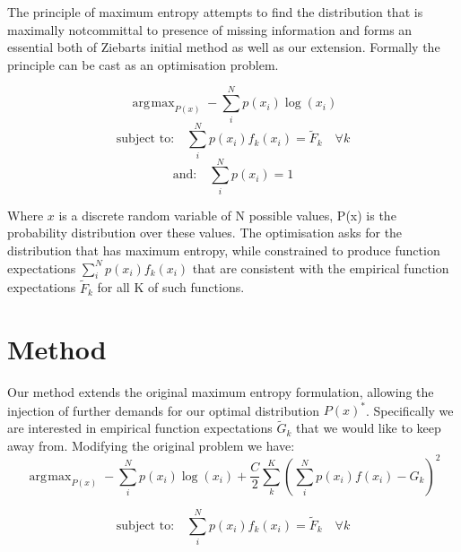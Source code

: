 \documentclass[letterpaper]{article}
\DeclareMathOperator*{\argmax}{\arg\!\max}
\begin{document}
	The principle of maximum entropy attempts to find the distribution that is maximally notcommittal to presence of missing information \cite{jaynes1957information} and forms an essential both of Ziebarts
	initial method as well as our extension. Formally the principle can be cast as an optimisation problem.

	\begin{equation}
	\argmax_{P(x)} -\sum_i^N p(x_i)\log(x_i)
	\end{equation}
	\begin{equation}
	\text{subject to:} \quad \sum_i^N p(x_i)f_k(x_i) = \widetilde{F}_k \quad \forall k \label{eqn:constraint1}
	\end{equation}
	\begin{equation}
	\text{and:} \quad \sum_i^N p(x_i) = 1 \label{eqn:constraint2}
	\end{equation}

	Where $x$ is a discrete random variable of N possible values, P(x) is the probability distribution over these values. The optimisation asks for the distribution that has maximum entropy, while constrained to produce function expectations $\sum_i^N p(x_i)f_k(x_i)$ that are consistent with the empirical function expectations $\widetilde{F}_k$ for all K of such functions.\\


\section{Method}
	Our method extends the original maximum entropy formulation, allowing the injection of further demands for our optimal distribution $P(x)^*$. Specifically we are interested in empirical function expectations $\widetilde{G}_k$ that we would like to keep away from. Modifying the original problem we have:  
	\begin{equation}
	\argmax_{P(x)} -\sum_i^N p(x_i)\log(x_i) + \frac{C}{2}\sum_k^K(\sum_i^N p(x_i)f(x_i) - G_k)^2
	\end{equation}
	

	\begin{equation}
	\text{subject to:} \quad \sum_i^N p(x_i)f_k(x_i) = \widetilde{F}_k \quad \forall k \label{eqn:match_constraint}
	\end{equation}
\end{document}
